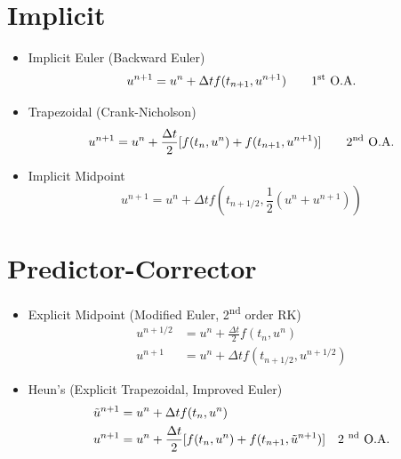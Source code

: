 \documentclass[oneside,a4paper,11pt]{report}
\begin{document}
\section{Implicit}
\begin{itemize}
\item Implicit Euler (Backward Euler)
\begin{equation}
u^{n+1} = u^n + \Delta t f(t_{n+1}, u^{n+1}) \qquad \text{1\textsuperscript{st} O.A.}
\end{equation}

\item Trapezoidal (Crank-Nicholson)
\begin{equation}
u^{n+1} = u^n + \frac{\Delta t}{2} [ f(t_n, u^n) + f(t_{n+1}, u^{n+1}) ] \qquad \text{2\textsuperscript{nd} O.A.}
\end{equation}

\item Implicit Midpoint
\begin{equation}
    u^{n+1} = u^n + \Delta t f\left (t_{n+1/2}, \frac{1}{2} \left (u^n + u^{n+1} \right )\right)
\end{equation}

\end{itemize}

\section{Predictor-Corrector}
\begin{itemize}
\item Explicit Midpoint (Modified Euler, 2\textsuperscript{nd} order RK)
\begin{align}
u^{n+1/2} &= u^n + \frac{\Delta t}{2} f(t_n, u^n) \nonumber \\
u^{n+1}   &= u^n + \Delta t f(t_{n+1/2}, u^{n+1/2})
\end{align}

\item Heun's (Explicit Trapezoidal, Improved Euler)
\begin{align}
\tilde{u}^{n+1} &= u^n + \Delta t f(t_n, u^n) \nonumber \\
u^{n+1}   &= u^n + \frac{\Delta t}{2} [ f(t_n, u^n) + f(t_{n+1}, \tilde{u}^{n+1}) ] \quad \text{2 \textsuperscript{nd} O.A.}
\end{align}

\end{itemize}
\end{document}
